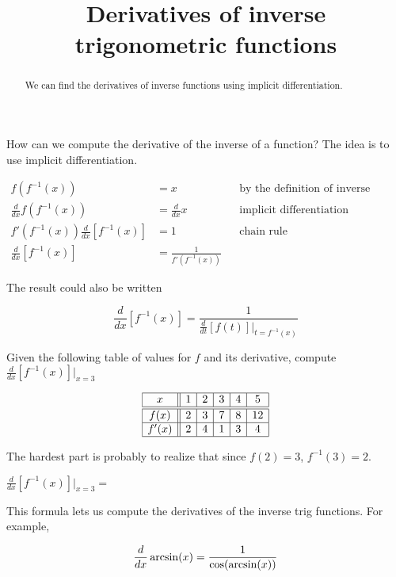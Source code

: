 \documentclass{ximera}
\title{Derivatives of inverse trigonometric functions}
\begin{document}
\begin{abstract}
 We can find the derivatives of inverse functions using implicit differentiation.
\end{abstract}

\maketitle

How can we compute the derivative of the inverse of a function? The idea is to use implicit differentiation. 

\begin{align*}
	f(f^{-1}(x)) &= x  && \text{by the definition of inverse functions} \\
	\frac{d}{dx} f(f^{-1}(x)) &=  \frac{d}{dx} x &&\text{implicit differentiation}\\
	 f'(f^{-1}(x))\frac{d}{dx}[ f^{-1}(x)] &= 1 &&\text{chain rule}\\
	 \frac{d}{dx}[ f^{-1}(x)] &= \frac{1}{f'(f^{-1}(x))}
\end{align*}

The result could also be written 

\[
\frac{d}{dx}[ f^{-1}(x)] = \frac{1}{\frac{d}{dt}\left[f(t)\right]\big|_{t=f^{-1}(x)}}
\]

\begin{question}
	Given the following table of values for $f$ and its derivative, compute $\frac{d}{dx}\left[ f^{-1}(x)\right]\big|_{x=3}$
	
	\[
\begin{array}{|c||c|c|c|c|c|}
\hline
 x    & 1 & 2 & 3 & 4 & 5 \\ \hline \hline 
f(x)  & 2 & 3 & 7 & 8 & 12 \\ \hline
f'(x) & 2 & 4 & 1 & 3 & 4 \\ \hline
\end{array}
\]
	\begin{hint}
		The hardest part is probably to realize that since $f(2)=3$, $f^{-1}(3)=2$.
	\end{hint}
	$\frac{d}{dx}\left[ f^{-1}(x)\right]\big|_{x=3} = $ 


\end{question}

This formula lets us compute the derivatives of the inverse trig functions.  For example,

\[
	\frac{d}{dx} \arcsin(x) = \frac{1}{\cos(\arcsin(x))}\\
\]
\end{document}
